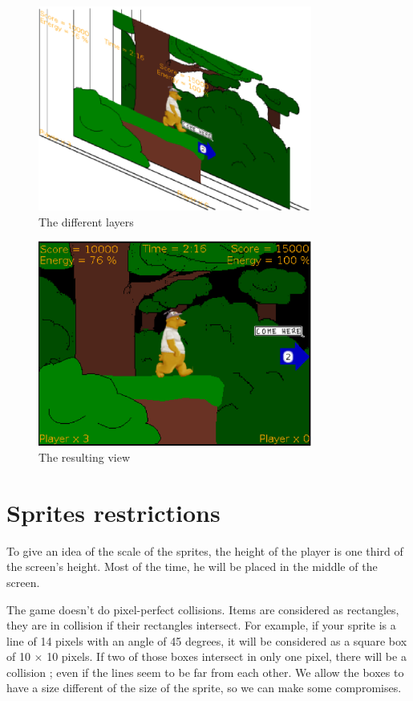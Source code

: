 \documentclass{article}
\begin{document}
\begin{figure}
 \begin{center}
  \includegraphics[width=9cm]{pictures/layers-separated}
  \caption{The different layers}
  \label{fig-layers-separated}
  \end{center}
\end{figure}

\begin{figure}
 \begin{center}
  \includegraphics[width=9cm]{pictures/layers-result}
  \caption{The resulting view}
  \label{fig-layers-result}
 \end{center}
\end{figure}

\section{Sprites restrictions}
To give an idea of the scale of the sprites, the height of the player
is one third of the screen's height. Most of the time, he will be
placed in the middle of the screen.

The game doesn't do pixel-perfect collisions. Items are considered as
rectangles, they are in collision if their rectangles intersect. For
example, if your sprite is a line of 14 pixels with an angle of 45
degrees, it will be considered as a square box of 10 $\times$ 10
pixels. If two of those boxes intersect in only one pixel, there will
be a collision ; even if the lines seem to be far from each other. We
allow the boxes to have a size different of the size of the sprite, so
we can make some compromises.
\end{document}
